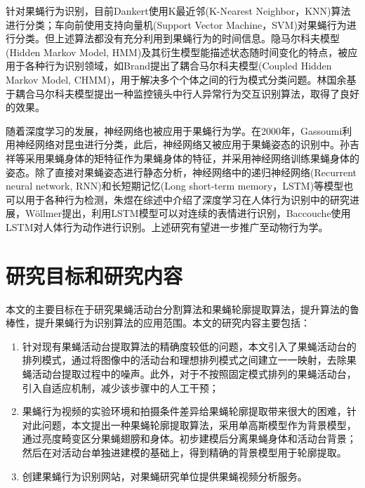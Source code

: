针对果蝇行为识别，目前Dankert使用K最近邻(K-Nearest Neighbor，KNN)算法进行分类\cite{altman1992introduction}；车向前使用支持向量机(Support Vector Machine，SVM)对果蝇行为进行分类\cite{chexiangqian,SVM_weight_2004}。但上述算法都没有充分利用到果蝇行为的时间信息。隐马尔科夫模型(Hidden Markov Model, HMM)及其衍生模型能描述状态随时间变化的特点，被应用于各种行为识别领域\cite{baum1966statistical,rabiner1986introduction,ghahramani1997factorial,fine1998hierarchical,blunsom2004hidden}，如Brand提出了耦合马尔科夫模型(Coupled Hidden Markov Model, CHMM)\cite{brand1997coupled}，用于解决多个个体之间的行为模式分类问题。林国余基于耦合马尔科夫模型提出一种监控镜头中行人异常行为交互识别算法，取得了良好的效果\cite{林国余2013基于耦合隐马尔可夫模型的异常交互行为识别}。

随着深度学习的发展\cite{demuth2014neural,specht1991general}，神经网络也被应用于果蝇行为学。在2000年，Gassoumi利用神经网络对昆虫进行分类\cite{gassoumi2000neural}，此后，神经网络又被应用于果蝇姿态的识别中。孙吉祥等采用果蝇身体的矩特征作为果蝇身体的特征，并采用神经网络训练果蝇身体的姿态\cite{孙吉祥2014果蝇求偶行为的图像识别算法研究}。除了直接对果蝇姿态进行静态分析，神经网络中的递归神经网络(Recurrent neural network, RNN)和长短期记忆(Long short-term memory，LSTM)等模型也可以用于各种行为检测\cite{mikolov2010recurrent,gers2000learning,veeriah2015differential}，朱煜在综述中介绍了深度学习在人体行为识别中的研究进展\cite{朱煜2016基于深度学习的人体行为识别算法综述}，W{\"o}llmer提出，利用LSTM模型可以对连续的表情进行识别\cite{wollmer2013lstm}，Baccouche使用LSTM对人体行为动作进行识别\cite{baccouche2011sequential}。上述研究有望进一步推广至动物行为学。

\section{研究目标和研究内容}

本文的主要目标在于研究果蝇活动台分割算法和果蝇轮廓提取算法，提升算法的鲁棒性，提升果蝇行为识别算法的应用范围。本文的研究内容主要包括：
\begin{enumerate}
\item 针对现有果蝇活动台提取算法的精确度较低的问题，本文引入了果蝇活动台的排列模式，通过将图像中的活动台和理想排列模式之间建立一一映射，去除果蝇活动台提取过程中的噪声。此外，对于不按照固定模式排列的果蝇活动台，引入自适应机制，减少该步骤中的人工干预；
\item 果蝇行为视频的实验环境和拍摄条件差异给果蝇轮廓提取带来很大的困难，针对此问题，本文提出一种果蝇轮廓提取算法，采用单高斯模型作为背景模型，通过亮度畸变区分果蝇翅膀和身体。初步建模后分离果蝇身体和活动台背景；然后在对活动台单独进建模的基础上，得到精确的背景模型用于轮廓提取。
\item 创建果蝇行为识别网站，对果蝇研究单位提供果蝇视频分析服务。
\end{enumerate}

